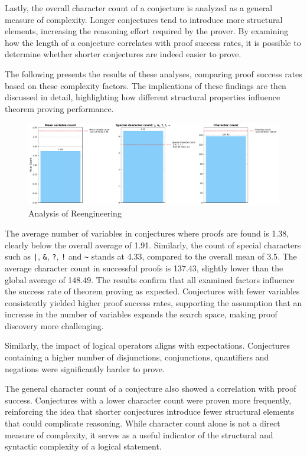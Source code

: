 \documentclass[english,version-2020-11]{uzl-thesis}
\begin{document}
Lastly, the overall character count of a conjecture is analyzed as a general measure of complexity. Longer conjectures tend to introduce more structural elements, increasing the reasoning effort required by the prover. By examining how the length of a conjecture correlates with proof success rates, it is possible to determine whether shorter conjectures are indeed easier to prove.

The following presents the results of these analyses, comparing proof success rates based on these complexity factors. The implications of these findings are then discussed in detail, highlighting how different structural properties influence theorem proving performance.


\begin{figure}[h!]
    \centering
    \includegraphics[width=\textwidth]{combined_graphs.pdf}
    \caption{Analysis of Reengineering}
    \label{fig:analysis_reeingieering}
\end{figure}
\FloatBarrier

The average number of variables in conjectures where proofs are found is 1.38, clearly below the overall average of 1.91. Similarly, the count of special characters such as \texttt{|}, \texttt{\&}, \texttt{?}, \texttt{!} and \texttt{\textasciitilde} stands at 4.33, compared to the overall mean of 3.5. The average character count in successful proofs is 137.43, slightly lower than the global average of 148.49.
The results confirm that all examined factors influence the success rate of theorem proving as expected. Conjectures with fewer variables consistently yielded higher proof success rates, supporting the assumption that an increase in the number of variables expands the search space, making proof discovery more challenging.

Similarly, the impact of logical operators aligns with expectations. Conjectures containing a higher number of disjunctions, conjunctions, quantifiers and negations were significantly harder to prove.

The general character count of a conjecture also showed a correlation with proof success. Conjectures with a lower character count were proven more frequently, reinforcing the idea that shorter conjectures introduce fewer structural elements that could complicate reasoning. While character count alone is not a direct measure of complexity, it serves as a useful indicator of the structural and syntactic complexity of a logical statement.
\end{document}
